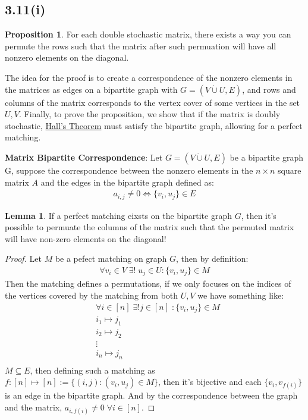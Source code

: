 \documentclass[]{article}
\theoremstyle{definition}
\newtheorem{prop}{Proposition}[section]  %
\newtheorem{lemma}{Lemma}[subsection]  %
\begin{document}
    \subsection{3.11(i)}
        \begin{prop}
            For each double stochastic matrix, there exists a way you can permute the rows such that the matrix after such permuation will have all nonzero elements on the diagonal. 
        \end{prop}
        The idea for the proof is to create a correspondence of the nonzero elements in the matrices as edges on a bipartite graph with $G = (V\dot\cup U, E)$, and rows and columns of the matrix corresponds to the vertex cover of some vertices in the set $U, V$. Finally, to prove the proposition, we show that if the matrix is doubly stochastic, \hyperref[theorem:Hall]{Hall's Theorem} must satisfy the bipartite graph, allowing for a perfect matching. 
        \par
        \textbf{Matrix Bipartite Correspondence}: Let $G = (V\dot\cup U, E)$ be a bipartite graph G, suppose the correspondence between the nonzero elements in the $n\times n$ square matrix $A$ and the edges in the bipartite graph defined as: 
        \begin{align}
            a_{i, j}\neq 0 \iff \{v_i, u_j\} \in E
        \end{align}
        \begin{lemma}
            If a perfect matching eixsts on the bipartite graph $G$, then it's possible to permuate the columns of the matrix such that the permuted matrix will have non-zero elements on the diagonal!
        \end{lemma}
        \begin{proof}
            Let $M$ be a pefect matching on graph $G$, then by definition: 
            \begin{align}
                \forall v_i \in V \; \exists!\; u_j \in U: \{v_i, u_j\}\in M
            \end{align}
            Then the matching defines a permutations, if we only focuses on the indices of the vertices covered by the matching from both $U, V$ we have something like: 
            \begin{align}
                & \forall i\in [n] \;\exists ! j\in [n]\; : \{v_i, u_j\} \in {M}
                \\
                & i_1 \mapsto j_1 \\
                & i_2 \mapsto j_2 \\ 
                & \vdots \\ 
                & i_n \mapsto j_n \\
            \end{align}
            $M\subseteq E$, then defining such a matching as $f: [n]\mapsto [n] := \{(i, j): (v_i, u_j)\in M\}$, then it's bijective and each $\{v_i, v_{f(i)}\}$ is an edge in the bipartite graph. And by the correspondence between the graph and the matrix, $a_{i, f(i)} \neq 0 \;\forall i \in [n]$. 
        \end{proof}
\end{document}
